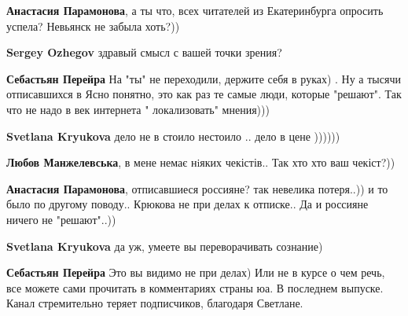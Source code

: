 \begin{itemize}
\begin{itemize}
\textbf{Анастасия Парамонова}, а ты что, всех читателей из Екатеринбурга опросить успела? Невьянск не забыла хоть?))


 
\textbf{Sergey Ozhegov} здравый смысл с вашей точки зрения?

 
\textbf{Себастьян Перейра} На "ты" не переходили, держите себя в руках) .
Ну а тысячи отписавшихся в Ясно понятно, это как раз те самые люди, которые "решают".
Так что не надо в век интернета " локализовать" мнения)))

 
\textbf{Svetlana Kryukova} дело не в стоило нестоило .. дело в цене ))))))

 
\textbf{Любов Манжелевська}, в мене немає нiяких чекістів.. Так хто хто ваш чекіст?))

 
\textbf{Анастасия Парамонова}, отписавшиеся россияне? так невелика потеря..)) и то было по другому поводу.. Крюкова не при делах к отписке.. Да и россияне ничего не "решают"..))

 
\textbf{Svetlana Kryukova} да уж, умеете вы переворачивать сознание)

 
\textbf{Себастьян Перейра} Это вы видимо не при делах) Или не в курсе о чем речь, все можете сами прочитать в комментариях страны юа. В последнем выпуске. Канал стремительно теряет подписчиков, благодаря Светлане.

\end{itemize}



\end{itemize}

